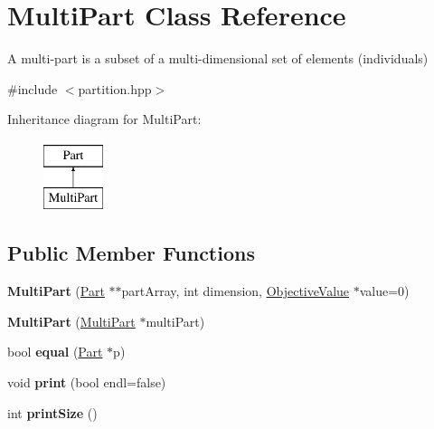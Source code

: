 \hypertarget{classMultiPart}{\section{Multi\-Part Class Reference}
\label{classMultiPart}
}


A multi-\/part is a subset of a multi-\/dimensional set of elements (individuals)  




{\ttfamily \#include $<$partition.\-hpp$>$}

Inheritance diagram for Multi\-Part\-:\begin{figure}[H]
\begin{center}
\leavevmode
\includegraphics[height=2.000000cm]{classMultiPart}
\end{center}
\end{figure}
\subsection*{Public Member Functions}
\begin{DoxyCompactItemize}
\item 
\hypertarget{classMultiPart_a69dd615086275f61fbc464a45e0e9c20}{{\bfseries Multi\-Part} (\hyperlink{classPart}{Part} $\ast$$\ast$part\-Array, int dimension, \hyperlink{classObjectiveValue}{Objective\-Value} $\ast$value=0)}\label{classMultiPart_a69dd615086275f61fbc464a45e0e9c20}

\item 
\hypertarget{classMultiPart_a5cf49ba2f0caeb02b20dc4c57d78e9db}{{\bfseries Multi\-Part} (\hyperlink{classMultiPart}{Multi\-Part} $\ast$multi\-Part)}\label{classMultiPart_a5cf49ba2f0caeb02b20dc4c57d78e9db}

\item 
\hypertarget{classMultiPart_aae389b0a2cdaf88ce4658ac87eedab97}{bool {\bfseries equal} (\hyperlink{classPart}{Part} $\ast$p)}\label{classMultiPart_aae389b0a2cdaf88ce4658ac87eedab97}

\item 
\hypertarget{classMultiPart_a76ffda0373533f175473385a8fc5b6af}{void {\bfseries print} (bool endl=false)}\label{classMultiPart_a76ffda0373533f175473385a8fc5b6af}

\item 
\hypertarget{classMultiPart_a46d5be2eeff19d9a41a05c21ad16bec0}{int {\bfseries print\-Size} ()}\label{classMultiPart_a46d5be2eeff19d9a41a05c21ad16bec0}

\end{DoxyCompactItemize}
